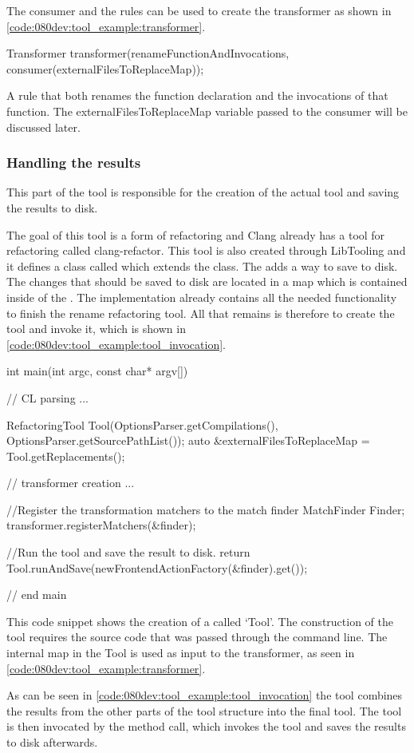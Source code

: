 The consumer and the rules can be used to create the transformer as shown in \cref{code:080dev:tool_example:transformer}.

\begin{listing}[H]
    \begin{cppcode}
Transformer transformer(renameFunctionAndInvocations, consumer(externalFilesToReplaceMap));
    \end{cppcode}
    \caption{A rule that both renames the function declaration and the invocations of that function. The externalFilesToReplaceMap variable passed to the consumer will be discussed later.}
    \label{code:080dev:tool_example:transformer}
\end{listing}

\subsubsection*{Handling the results}

This part of the tool is responsible for the creation of the actual tool and saving the results to disk. 

The goal of this tool is a form of refactoring and Clang already has a tool for refactoring called clang-refactor. This tool is also created through LibTooling and it defines a class called  which extends the  class. The  adds a way to save  to disk. The changes that should be saved to disk are located in a  map which is contained inside of the . The  implementation already contains all the needed functionality to finish the rename refactoring tool. All that remains is therefore to create the tool and invoke it, which is shown in \cref{code:080dev:tool_example:tool_invocation}.


\begin{listing}[H]
    \begin{cppcode}
int main(int argc, const char* argv[]) {
// CL parsing
...

RefactoringTool Tool(OptionsParser.getCompilations(),
                     OptionsParser.getSourcePathList());
auto &externalFilesToReplaceMap = Tool.getReplacements();

// transformer creation
...

//Register the transformation matchers to the match finder
MatchFinder Finder;
transformer.registerMatchers(&finder);

//Run the tool and save the result to disk.
return Tool.runAndSave(newFrontendActionFactory(&finder).get());
} // end main
    \end{cppcode}
    \caption{This code snippet shows the creation of a  called `Tool'. The construction of the tool requires the source code that was passed through the command line. The internal map in the Tool is used as input to the transformer, as seen in \cref{code:080dev:tool_example:transformer}.}
    \label{code:080dev:tool_example:tool_invocation}
\end{listing}

As can be seen in \cref{code:080dev:tool_example:tool_invocation} the tool combines the results from the other parts of the tool structure into the final tool. The tool is then invocated by the  method call, which invokes the tool and saves the results to disk afterwards. 
